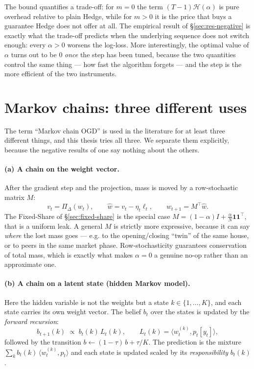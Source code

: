 \documentclass[12pt,a4paper,oneside]{report}
\renewcommand{\_}{\oldunderscore\allowbreak}
\theoremstyle{definition}
\theoremstyle{plain}
\theoremstyle{remark}
\begin{document}
The bound quantifies a trade-off: for $m=0$ the term $(T-1)\mathcal{H}(\alpha)$ is pure overhead
relative to plain Hedge, while for $m>0$ it is the price that buys a guarantee Hedge does not
offer at all. The empirical result of \S\ref{sec:res-negative} is exactly what the trade-off
predicts when the underlying sequence does not switch enough: every $\alpha>0$ worsens the
log-loss. More interestingly, the optimal value of $\alpha$ turns out to be $0$ \emph{once} the
step has been tuned, because the two quantities control the same thing --- how fast the
algorithm forgets --- and the step is the more efficient of the two instruments.

\section{Markov chains: three different uses}
\label{sec:markov-theory}

The term ``Markov chain OGD'' is used in the literature for at least three different things, and
this thesis tries all three. We separate them explicitly, because the negative results of one
say nothing about the others.

\paragraph{(a) A chain on the weight vector.} After the gradient step and the projection, mass is
moved by a row-stochastic matrix $M$:
\[
v_t = \Pi_{\Delta}(w_t), \qquad \hat{w} = v_t - \eta_t \ell_t, \qquad w_{t+1} = M^{\!\top}\hat{w}.
\]
The Fixed-Share of \S\ref{sec:fixed-share} is the special case
$M = (1-\alpha)I + \tfrac{\alpha}{N}\mathbf{1}\mathbf{1}^{\!\top}$, that is a uniform leak. A
general $M$ is strictly more expressive, because it can say \emph{where} the lost mass goes ---
e.g. to the opening/closing ``twin'' of the same house, or to peers in the same market phase.
Row-stochasticity guarantees conservation of total mass, which is exactly what makes $\alpha=0$ a
genuine no-op rather than an approximate one.

\paragraph{(b) A chain on a latent state (hidden Markov model).} Here the hidden variable is not
the weights but a state $k\in\{1,\dots,K\}$, and each state carries its own weight vector. The
belief $b_t$ over the states is updated by the \emph{forward recursion}:
\[
b_{t+1}(k) \;\propto\; b_t(k)\, L_t(k), \qquad L_t(k) = \langle w^{(k)}_t, p_t[y_t]\rangle,
\]
followed by the transition $b \leftarrow (1-\tau)\,b + \tau/K$. The prediction is the mixture
$\sum_k b_t(k)\,\langle w^{(k)}_t, p_t\rangle$ and each state is updated scaled by its
\emph{responsibility} $b_t(k)$.
\end{document}
